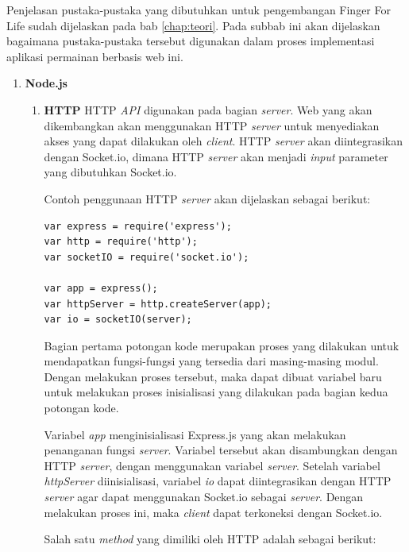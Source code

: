 Penjelasan pustaka-pustaka yang dibutuhkan untuk pengembangan Finger For Life sudah dijelaskan pada bab \ref{chap:teori}. Pada subbab ini akan dijelaskan bagaimana pustaka-pustaka tersebut digunakan dalam proses implementasi aplikasi permainan berbasis web ini.

\begin{enumerate}
	\item \textbf{Node.js}
	\begin{enumerate}
		\item \textbf{HTTP}
		HTTP \textit{API} digunakan pada bagian \textit{server}. Web yang akan dikembangkan akan menggunakan HTTP \textit{server} untuk menyediakan akses yang dapat dilakukan oleh \textit{client}. HTTP \textit{server} akan diintegrasikan dengan Socket.io, dimana HTTP \textit{server} akan menjadi \textit{input} parameter yang dibutuhkan Socket.io.
		
		Contoh penggunaan HTTP \textit{server} akan dijelaskan sebagai berikut:
\begin{lstlisting}
var express = require('express');
var http = require('http');
var socketIO = require('socket.io');

var app = express();
var httpServer = http.createServer(app);
var io = socketIO(server);
\end{lstlisting}

Bagian pertama potongan kode merupakan proses yang dilakukan untuk mendapatkan fungsi-fungsi yang tersedia dari masing-masing modul. Dengan melakukan proses tersebut, maka dapat dibuat variabel baru untuk melakukan proses inisialisasi yang dilakukan pada bagian kedua potongan kode.

Variabel \textit{app} menginisialisasi Express.js yang akan melakukan penanganan fungsi \textit{server}. Variabel tersebut akan disambungkan dengan HTTP \textit{server}, dengan menggunakan variabel \textit{server}. Setelah variabel \textit{httpServer} diinisialisasi, variabel \textit{io} dapat diintegrasikan dengan HTTP \textit{server} agar dapat menggunakan Socket.io sebagai \textit{server}. Dengan melakukan proses ini, maka \textit{client} dapat terkoneksi dengan Socket.io.
		
		Salah satu \textit{method} yang dimiliki oleh HTTP adalah sebagai berikut:
		

\end{enumerate}
\end{enumerate}
